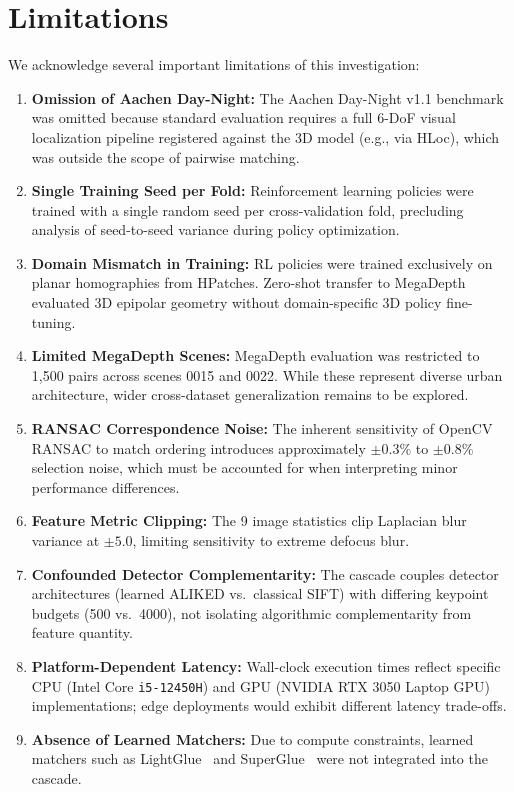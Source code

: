 \documentclass[conference]{IEEEtran}
\begin{document}
\section{Limitations}
\label{sec:limitations}

We acknowledge several important limitations of this investigation:
\begin{enumerate}
    \item \textbf{Omission of Aachen Day-Night:} The Aachen Day-Night v1.1 benchmark was omitted because standard evaluation requires a full 6-DoF visual localization pipeline registered against the 3D model (e.g., via HLoc), which was outside the scope of pairwise matching.
    \item \textbf{Single Training Seed per Fold:} Reinforcement learning policies were trained with a single random seed per cross-validation fold, precluding analysis of seed-to-seed variance during policy optimization.
    \item \textbf{Domain Mismatch in Training:} RL policies were trained exclusively on planar homographies from HPatches. Zero-shot transfer to MegaDepth evaluated 3D epipolar geometry without domain-specific 3D policy fine-tuning.
    \item \textbf{Limited MegaDepth Scenes:} MegaDepth evaluation was restricted to 1,500 pairs across scenes 0015 and 0022. While these represent diverse urban architecture, wider cross-dataset generalization remains to be explored.
    \item \textbf{RANSAC Correspondence Noise:} The inherent sensitivity of OpenCV RANSAC to match ordering introduces approximately $\pm 0.3\%$ to $\pm 0.8\%$ selection noise, which must be accounted for when interpreting minor performance differences.
    \item \textbf{Feature Metric Clipping:} The 9 image statistics clip Laplacian blur variance at $\pm 5.0$, limiting sensitivity to extreme defocus blur.
    \item \textbf{Confounded Detector Complementarity:} The cascade couples detector architectures (learned ALIKED vs.\ classical SIFT) with differing keypoint budgets (500 vs.\ 4000), not isolating algorithmic complementarity from feature quantity.
    \item \textbf{Platform-Dependent Latency:} Wall-clock execution times reflect specific CPU (Intel Core \texttt{i5-12450H}) and GPU (NVIDIA RTX 3050 Laptop GPU) implementations; edge deployments would exhibit different latency trade-offs.
    \item \textbf{Absence of Learned Matchers:} Due to compute constraints, learned matchers such as LightGlue~\cite{lindenberger2023lightglue} and SuperGlue~\cite{sarlin2020superglue} were not integrated into the cascade.
\end{enumerate}
\end{document}
